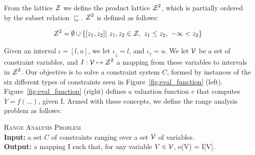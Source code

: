 \documentclass{llncs}
\newcommand{\lb}[1]{#1_{\downarrow}}
\newcommand{\ub}[1]{#1_{\uparrow}}
\newcommand{\varset}[1]{\mbox{$\cal{#1}$}}
\begin{document}
From the lattice $\varset{Z}$ we define the product lattice
$\varset{Z}^2$, which is partially ordered by the subset relation
$\sqsubseteq$.
$\varset{Z}^2$ is defined as follows:

\begin{equation*}
\varset{Z}^2 = \emptyset \cup \{[z_1, z_2] | \ z_1,z_2 \in \varset{Z},
\ z_1 \leq z_2, \  -\infty < z_2 \}
\end{equation*}

Given an interval $\iota = [l, u]$, we let $\lb{\iota} = l$, and
$\ub{\iota} = u$.
We let \varset{V} be a set of constraint variables, and
$I: \varset{V} \mapsto \varset{Z}^2$ a
mapping from these variables to intervals in $\varset{Z}^2$.
Our objective is to solve a constraint system $C$, formed by instances of the
six different types of constraints seen in Figure~\ref{fig:eval_function}
(left).
Figure~\ref{fig:eval_function} (right) defines a valuation function $e$ that
computes $Y = f(\ldots)$, given I.
Armed with these concepts, we define the range analysis problem as follows:

\begin{definition}
\label{def:rcp}
\textsc{Range Analysis Problem} \\
\textbf{Input:} a set $C$ of constraints ranging over a set \varset{V} of
variables. \\
\textbf{Output:} a mapping I such that, for any variable
$V \in \varset{V}$, e(V) = I[V].
\end{definition}
\end{document}
